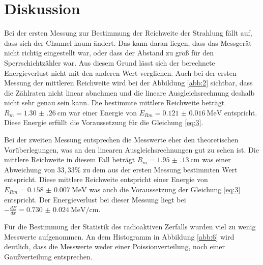 \section{Diskussion}

Bei der ersten Messung zur Bestimmung der Reichweite der Strahlung fällt auf, dass
sich der Channel kaum ändert. Das kann daran liegen, dass das Messgerät nicht
richtig eingestellt war, oder dass der Abstand zu groß für den Sperrschichtzähler
war. Aus diesem Grund lässt sich der berechnete Energieverlust nicht mit den anderen Wert
verglichen.
Auch bei der ersten Messung der mittleren Reichweite wird bei der Abbildung \ref{abb:2}
sichtbar, dass die Zählraten nicht linear abnehmen und die lineare Ausgleichsrechnung
deshalb nicht sehr genau sein kann. Die bestimmte mittlere Reichweite beträgt
$R_m = \SI{1.30(26)}{\centi\meter}$ war einer Energie von $E_{Rm} = \SI{0.121(16)}{\mega\eV}$
entspricht. Diese Energie erfüllt die Voraussetzung für die Gleichung \ref{eq:3}.

Bei der zweiten Messung entsprechen die Messwerte eher den theoretischen Vorüberlegungen,
was an den linearen Ausgleichsrechnungen gut zu sehen ist. Die mittlere Reichweite
in diesem Fall beträgt $R_m = \SI{1.95(13)}{\centi\meter}$ was einer Abweichung
von $33,33 \%$ zu dem aus der ersten Messung bestimmten Wert entspricht.
Diese mittlere Reichweite entspricht einer Energie von $E_{Rm} = \SI{0.158(7)}{\mega\eV}$
was auch die Voraussetzung der Gleichung \ref{eq:3} entspricht.
Der Energieverlust bei dieser Messung liegt bei $-\frac{dE}{dx} = \SI{0.730(24)}{\mega\eV\per\centi\meter}$.

Für die Bestimmung der Statistik des radioaktiven Zerfalls wurden viel zu wenig
Messwerte aufgenommen. An dem Histogramm in Abbildung \ref{abb:6} wird deutlich,
dass die Messwerte weder einer Poissionverteilung, noch einer Gaußverteilung
entsprechen. 
